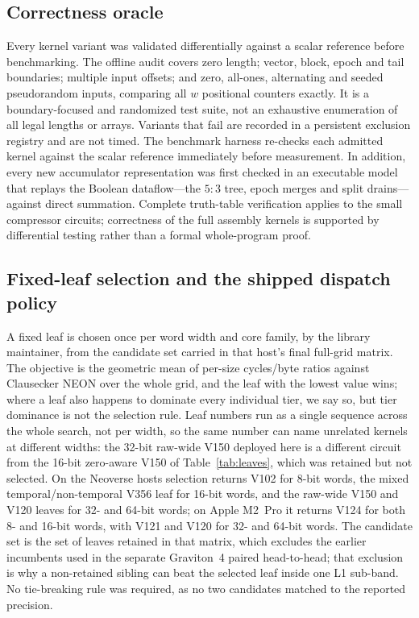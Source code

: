 \documentclass[fleqn,10pt]{wlscirep}
\begin{document}
\subsection*{Correctness oracle}
Every kernel variant was validated differentially against a scalar reference before benchmarking. The offline audit covers zero length; vector, block, epoch and tail boundaries; multiple input offsets; and zero, all-ones, alternating and seeded pseudorandom inputs, comparing all $w$ positional counters exactly. It is a boundary-focused and randomized test suite, not an exhaustive enumeration of all legal lengths or arrays. Variants that fail are recorded in a persistent exclusion registry and are not timed. The benchmark harness re-checks each admitted kernel against the scalar reference immediately before measurement. In addition, every new accumulator representation was first checked in an executable model that replays the Boolean dataflow---the $5{:}3$ tree, epoch merges and split drains---against direct summation. Complete truth-table verification applies to the small compressor circuits; correctness of the full assembly kernels is supported by differential testing rather than a formal whole-program proof.

\subsection*{Fixed-leaf selection and the shipped dispatch policy}
A fixed leaf is chosen once per word width and core family, by the library maintainer, from the candidate set carried in that host's final full-grid matrix. The objective is the geometric mean of per-size cycles/byte ratios against Clausecker NEON over the whole grid, and the leaf with the lowest value wins; where a leaf also happens to dominate every individual tier, we say so, but tier dominance is not the selection rule. Leaf numbers run as a single sequence across the whole search, not per width, so the same number can name unrelated kernels at different widths: the 32-bit raw-wide V150 deployed here is a different circuit from the 16-bit zero-aware V150 of Table~\ref{tab:leaves}, which was retained but not selected. On the Neoverse hosts selection returns V102 for 8-bit words, the mixed temporal/non-temporal V356 leaf for 16-bit words, and the raw-wide V150 and V120 leaves for 32- and 64-bit words; on Apple M2~Pro it returns V124 for both 8- and 16-bit words, with V121 and V120 for 32- and 64-bit words. The candidate set is the set of leaves retained in that matrix, which excludes the earlier incumbents used in the separate Graviton~4 paired head-to-head; that exclusion is why a non-retained sibling can beat the selected leaf inside one L1 sub-band. No tie-breaking rule was required, as no two candidates matched to the reported precision.
\end{document}
